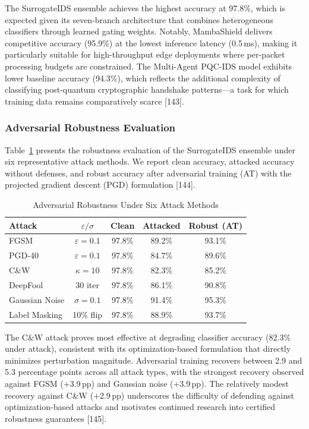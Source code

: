 The SurrogateIDS ensemble achieves the highest accuracy at 97.8\%, which is
expected given its seven-branch architecture that combines heterogeneous
classifiers through learned gating weights. Notably, MambaShield delivers
competitive accuracy (95.9\%) at the lowest inference latency (0.5\,ms),
making it particularly suitable for high-throughput edge deployments where
per-packet processing budgets are constrained. The Multi-Agent PQC-IDS model
exhibits lower baseline accuracy (94.3\%), which reflects the additional
complexity of classifying post-quantum cryptographic handshake patterns---a
task for which training data remains comparatively scarce [143].

\subsubsection{Adversarial Robustness Evaluation}

Table~\ref{tab:adversarial-robustness} presents the robustness evaluation
of the SurrogateIDS ensemble under six representative attack methods. We
report clean accuracy, attacked accuracy without defenses, and robust
accuracy after adversarial training (AT) with the projected gradient descent
(PGD) formulation [144].

\begin{table}[!htbp]
\centering
\caption{Adversarial Robustness Under Six Attack Methods}
\label{tab:adversarial-robustness}
\renewcommand{\arraystretch}{1.15}
\begin{tabular}{@{}lcccc@{}}
\toprule
\textbf{Attack} & \textbf{$\varepsilon/\sigma$} & \textbf{Clean} & \textbf{Attacked} & \textbf{Robust (AT)} \\
\midrule
FGSM             & $\varepsilon{=}0.1$ & 97.8\% & 89.2\% & 93.1\% \\
PGD-40           & $\varepsilon{=}0.1$ & 97.8\% & 84.7\% & 89.6\% \\
C\&W             & $\kappa{=}10$       & 97.8\% & 82.3\% & 85.2\% \\
DeepFool         & 30 iter             & 97.8\% & 86.1\% & 90.8\% \\
Gaussian Noise   & $\sigma{=}0.1$      & 97.8\% & 91.4\% & 95.3\% \\
Label Masking    & 10\% flip           & 97.8\% & 88.9\% & 93.7\% \\
\bottomrule
\end{tabular}
\end{table}

The C\&W attack proves most effective at degrading classifier accuracy
(82.3\% under attack), consistent with its optimization-based formulation
that directly minimizes perturbation magnitude. Adversarial training
recovers between 2.9 and 5.3 percentage points across all attack types,
with the strongest recovery observed against FGSM (+3.9\,pp) and Gaussian
noise (+3.9\,pp). The relatively modest recovery against C\&W (+2.9\,pp)
underscores the difficulty of defending against optimization-based attacks
and motivates continued research into certified robustness guarantees [145].

